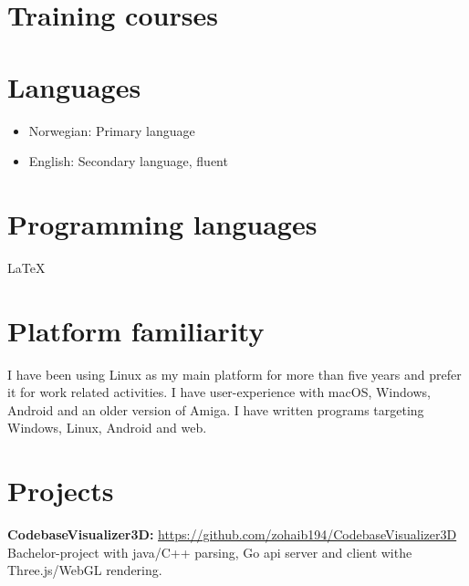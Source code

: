\documentclass{crudecv/crudecv}
\begin{document}
\section*{Training courses}
\begin{experiences}
\end{experiences}

\section*{Languages}
\begin{itemize}
    \item Norwegian: Primary language
    \item English: Secondary language, fluent
\end{itemize}


\section*{Programming languages}
\begin{skills}
	LaTeX
\end{skills}
\section*{Platform familiarity}
I have been using Linux as my main platform for more than five years and prefer it for work related activities. I have user-experience with macOS, Windows, Android and an older version of Amiga. I have written programs targeting Windows, Linux, Android and web.

\section*{Projects}
\textbf{CodebaseVisualizer3D:} \hfill \href{https://github.com/zohaib194/CodebaseVisualizer3D}{https://github.com/zohaib194/CodebaseVisualizer3D} \\
Bachelor-project with java/C++ parsing, Go api server and client withe Three.js/WebGL rendering.
\end{document}
